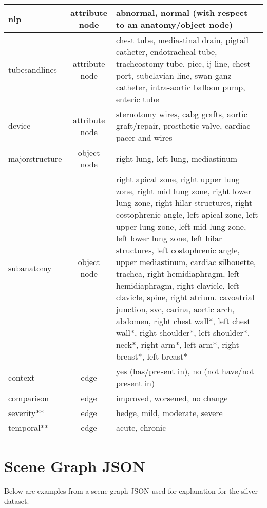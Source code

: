 \begin{table}[h]
{\begin{tabular}{|l|c|p{25em}|}
    \midrule
    nlp   & attribute node & abnormal, normal (with respect to an anatomy/object node) \\
    \midrule
    tubesandlines & attribute node & chest tube, mediastinal drain, pigtail catheter, endotracheal tube, tracheostomy tube, picc, ij line, chest port, subclavian line, swan-ganz catheter, intra-aortic balloon pump, enteric tube \\
    \midrule
    device & attribute node & sternotomy wires, cabg grafts, aortic graft/repair, prosthetic valve, cardiac pacer and wires \\
    \midrule
    \midrule
    majorstructure & object node & right lung, left lung, mediastinum \\
    \midrule
    subanatomy & object node & right apical zone, right upper lung zone, right mid lung zone, right lower lung zone, right hilar structures, right costophrenic angle, left apical zone, left upper lung zone, left mid lung zone, left lower lung zone, left hilar structures, left costophrenic angle, upper mediastinum, cardiac silhouette, trachea, right hemidiaphragm, left hemidiaphragm, right clavicle, left clavicle, spine, right atrium, cavoatrial junction, svc, carina, aortic arch, abdomen, right chest wall*, left chest wall*, right shoulder*, left shoulder*, neck*, right arm*, left arm*, right breast*, left breast* \\
    \midrule
    \midrule
    context & edge  & yes (has/present in), no (not have/not present in)\\
    \midrule
    comparison & edge  & improved, worsened, no change \\
    \midrule
    severity** & edge  & hedge, mild, moderate, severe \\
    \midrule
    temporal** & edge  & acute, chronic \\
    \bottomrule
    \end{tabular}
    }%
\end{table}

\newpage
\section{Scene Graph JSON}\label{jsonsg}
Below are examples from a scene graph JSON used for explanation for the silver dataset.

